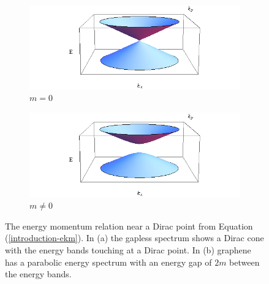 			\begin{figure}[h]
				 \begin{subfigure}[h]{0.45\textwidth}
					\centerline{\includegraphics[scale=0.5]{images/dispersion}}
					\caption{$m=0$}
				\end{subfigure}
				\hspace{1cm}
				\begin{subfigure}[h]{0.45\textwidth}
					\centerline{\includegraphics[scale=0.5]{images/dispersion-m}}
					\caption{$m\ne 0$}
				\end{subfigure}
				\caption{The energy momentum relation near a Dirac point from Equation (\ref{introduction-ekm}). In (a) the gapless spectrum shows a Dirac cone with the energy bands touching at a Dirac point. In (b) graphene has a parabolic energy spectrum with an energy gap of $2m$ between the energy bands.}
			\end{figure}
